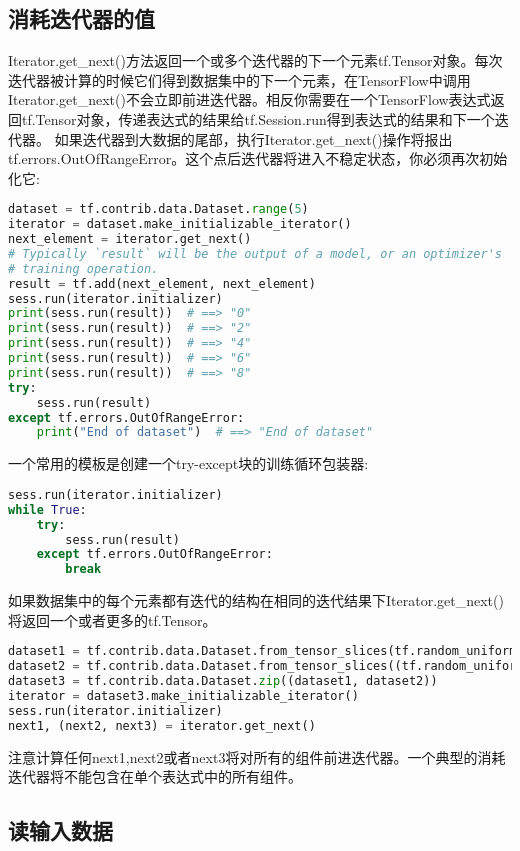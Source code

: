 \subsection{消耗迭代器的值}
Iterator.get\_next()方法返回一个或多个迭代器的下一个元素tf.Tensor对象。每次迭代器被计算的时候它们得到数据集中的下一个元素，在TensorFlow中调用Iterator.get\_next()不会立即前进迭代器。相反你需要在一个TensorFlow表达式返回tf.Tensor对象，传递表达式的结果给tf.Session.run得到表达式的结果和下一个迭代器。
如果迭代器到大数据的尾部，执行Iterator.get\_next()操作将报出tf.errors.OutOfRangeError。这个点后迭代器将进入不稳定状态，你必须再次初始化它:
\begin{lstlisting}[language=Python]
dataset = tf.contrib.data.Dataset.range(5)
iterator = dataset.make_initializable_iterator()
next_element = iterator.get_next()
# Typically `result` will be the output of a model, or an optimizer's
# training operation.
result = tf.add(next_element, next_element)
sess.run(iterator.initializer)
print(sess.run(result))  # ==> "0"
print(sess.run(result))  # ==> "2"
print(sess.run(result))  # ==> "4"
print(sess.run(result))  # ==> "6"
print(sess.run(result))  # ==> "8"
try:
    sess.run(result)
except tf.errors.OutOfRangeError:
    print("End of dataset")  # ==> "End of dataset"
\end{lstlisting}
一个常用的模板是创建一个try-except块的训练循环包装器:
\begin{lstlisting}[language=Python]
sess.run(iterator.initializer)
while True:
    try:
        sess.run(result)
    except tf.errors.OutOfRangeError:
        break
\end{lstlisting}
如果数据集中的每个元素都有迭代的结构在相同的迭代结果下Iterator.get\_next()将返回一个或者更多的tf.Tensor。
\begin{lstlisting}[language=Python]
dataset1 = tf.contrib.data.Dataset.from_tensor_slices(tf.random_uniform([4, 10]))
dataset2 = tf.contrib.data.Dataset.from_tensor_slices((tf.random_uniform([4]), tf.random_uniform([4, 100])))
dataset3 = tf.contrib.data.Dataset.zip((dataset1, dataset2))
iterator = dataset3.make_initializable_iterator()
sess.run(iterator.initializer)
next1, (next2, next3) = iterator.get_next()
\end{lstlisting}
注意计算任何next1,next2或者next3将对所有的组件前进迭代器。一个典型的消耗迭代器将不能包含在单个表达式中的所有组件。
\subsection{读输入数据}

